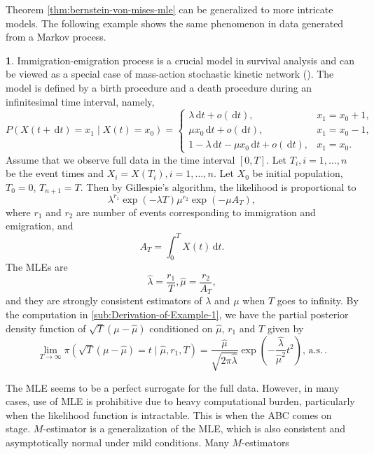 \documentclass[oneside,english]{amsbook}
\numberwithin{section}{chapter}
\numberwithin{equation}{section}
\numberwithin{figure}{section}
\theoremstyle{plain}
\theoremstyle{plain}
\theoremstyle{definition}
\theoremstyle{plain}
\theoremstyle{plain}
\theoremstyle{remark}
\theoremstyle{definition}
\newtheorem{example}{\protect\examplename}
\theoremstyle{definition}
\newcommand{\diff}{\,\mathrm{d}}
\newcommand{\ascv}{\,\mathrm{a.s.}\,}
\providecommand{\examplename}{Example}
\begin{document}
Theorem \ref{thm:bernstein-von-mises-mle} can be generalized to more
intricate models. The following example shows the same phenomenon
in data generated from a Markov process.
\begin{example}
\label{exa:Immigrate-emigrate-process}Immigration-emigration process
is {a } crucial
model in survival analysis and can be viewed as a special case of
mass-action stochastic kinetic  {network
} (\citet{wilkinson2011stochastic}). The model is defined by a birth
procedure and {a } death
procedure during an infinitesimal time interval, namely, 
\[
P\left(X\left(t+\diff t\right)=x_{1}\mid X\left(t\right)=x_{0}\right)=\begin{cases}
\lambda\diff t+o\left(\diff t\right), & x_{1}=x_{0}+1,\\
\mu x_{0}\diff t+o\left(\diff t\right), & x_{1}=x_{0}-1,\\
1-\lambda\diff t-\mu x_{0}\diff t+o\left(\diff t\right), & x_{1}=x_{0}.
\end{cases}
\]
Assume that we observe full data in the time interval $\left[0,T\right]$.
Let $T_{i},i=1,\ldots,n$ be the event times and $X_{i}=X\left(T_{i}\right),i=1,\ldots,n$.
Let $X_{0}$ be initial population, $T_{0}=0$, $T_{n+1}=T$. Then
by Gillespie's algorithm, the likelihood is proportional to 
\[
\lambda^{r_{1}}\exp\left(-\lambda T\right)\mu^{r_{2}}\exp\left(-\mu A_{T}\right),
\]
where $r_{1}$ and $r_{2}$ are number of events corresponding to
immigration and emigration, and 
\[
A_{T}=\int_{0}^{T}X\left(t\right)\diff t.
\]
The MLEs are 
\[
\hat{\lambda}=\frac{r_{1}}{T},\hat{\mu}=\frac{r_{2}}{A_{T}},
\]
and they are strongly consistent estimators of $\lambda$ {and $\mu$} when $T$ goes to
infinity. By the computation in  \ref{sub:Derivation-of-Example-1},
we have the partial posterior density function of $\sqrt{T}\left(\mu-\hat{\mu}\right)$
conditioned on $\hat{\mu}$, $r_{1}$ and $T$ given by 
\[
\lim_{T\rightarrow\infty}\pi\left(\sqrt{T}\left(\mu-\hat{\mu}\right)=t\mid\hat{\mu},r_{1},T\right)=\frac{\hat{\mu}}{\sqrt{2\pi\hat{\lambda}}}\exp\left(-\frac{\hat{\lambda}}{\hat{\mu}^{2}}t^{2}\right),\ascv.
\]

\end{example}
The MLE seems to be a perfect surrogate for  {the
} full data. However, in many cases, use of MLE is
prohibitive due to heavy computational burden, particularly when the
likelihood function is intractable. This is when the ABC comes on
stage. $M$-estimator is a generalization of the MLE, which is also
consistent and asymptotically normal under mild conditions. Many $M$-estimators
\end{document}
